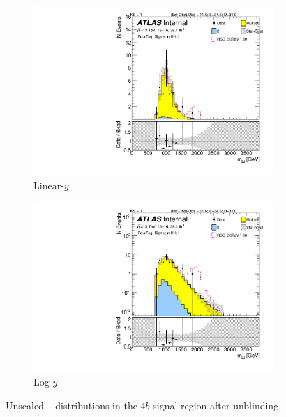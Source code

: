 \begin{figure}[htb!]
\begin{center}
    \captionsetup{justification=centering}
    \begin{subfigure}[b]{0.45\textwidth}
        \includegraphics[width=\textwidth,angle=-90]{figures/boosted/Signal_Syst/Moriond_bkg_9_FourTag_Signal_mHH_l.pdf}
        \caption{Linear-$y$}
        \label{fig:boosted-4b-signal-lin}
    \end{subfigure}
    \quad
    \begin{subfigure}[b]{0.45\textwidth}
        \includegraphics[width=\textwidth,angle=-90]{figures/boosted/Signal_Syst/Moriond_bkg_9_FourTag_Signal_mHH_l_1.pdf}
        \caption{Log-$y$}
        \label{fig:boosted-4b-signal-log}
    \end{subfigure}
  \caption{Unscaled \mtwoJ~ distributions in the $4b$ signal region after unblinding.}
  \label{fig:boosted-4b-signal-l}
\end{center}
\end{figure}


